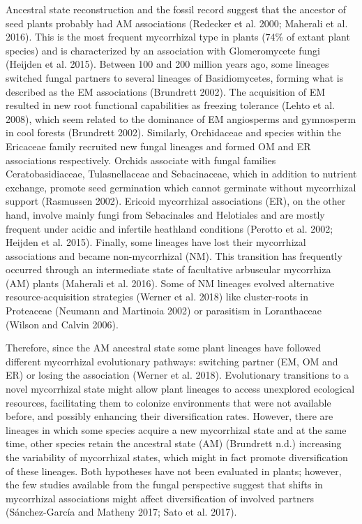 \documentclass[
  12pt,
]{article}
\begin{document}
Ancestral state reconstruction and the fossil record suggest that the
ancestor of seed plants probably had AM associations (Redecker et al.
2000; Maherali et al. 2016). This is the most frequent mycorrhizal type
in plants (74\% of extant plant species) and is characterized by an
association with Glomeromycete fungi (Heijden et al. 2015). Between 100
and 200 million years ago, some lineages switched fungal partners to
several lineages of Basidiomycetes, forming what is described as the EM
associations (Brundrett 2002). The acquisition of EM resulted in new
root functional capabilities as freezing tolerance (Lehto et al. 2008),
which seem related to the dominance of EM angiosperms and gymnosperm in
cool forests (Brundrett 2002). Similarly, Orchidaceae and species within
the Ericaceae family recruited new fungal lineages and formed OM and ER
associations respectively. Orchids associate with fungal families
Ceratobasidiaceae, Tulasnellaceae and Sebacinaceae, which in addition to
nutrient exchange, promote seed germination which cannot germinate
without mycorrhizal support (Rasmussen 2002). Ericoid mycorrhizal
associations (ER), on the other hand, involve mainly fungi from
Sebacinales and Helotiales and are mostly frequent under acidic and
infertile heathland conditions (Perotto et al. 2002; Heijden et al.
2015). Finally, some lineages have lost their mycorrhizal associations
and became non-mycorrhizal (NM). This transition has frequently occurred
through an intermediate state of facultative arbuscular mycorrhiza (AM)
plants (Maherali et al. 2016). Some of NM lineages evolved alternative
resource-acquisition strategies (Werner et al. 2018) like cluster-roots
in Proteaceae (Neumann and Martinoia 2002) or parasitism in Loranthaceae
(Wilson and Calvin 2006).

Therefore, since the AM ancestral state some plant lineages have
followed different mycorrhizal evolutionary pathways: switching partner
(EM, OM and ER) or losing the association (Werner et al. 2018).
Evolutionary transitions to a novel mycorrhizal state might allow plant
lineages to access unexplored ecological resources, facilitating them to
colonize environments that were not available before, and possibly
enhancing their diversification rates. However, there are lineages in
which some species acquire a new mycorrhizal state and at the same time,
other species retain the ancestral state (AM) (Brundrett n.d.)
increasing the variability of mycorrhizal states, which might in fact
promote diversification of these lineages. Both hypotheses have not been
evaluated in plants; however, the few studies available from the fungal
perspective suggest that shifts in mycorrhizal associations might affect
diversification of involved partners (Sánchez-García and Matheny 2017;
Sato et al. 2017).
\end{document}
